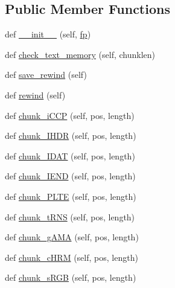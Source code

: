 \subsection*{Public Member Functions}
\begin{DoxyCompactItemize}
\item 
def \hyperlink{classPIL_1_1PngImagePlugin_1_1PngStream_a3918aac793d395b786702debde19877a}{\+\_\+\+\_\+init\+\_\+\+\_\+} (self, \hyperlink{classPIL_1_1PngImagePlugin_1_1ChunkStream_ae424bdb25dadd6b9ed72b6b320237703}{fp})
\item 
def \hyperlink{classPIL_1_1PngImagePlugin_1_1PngStream_a2c834960e5357ebe52041cbc9bd8fc65}{check\+\_\+text\+\_\+memory} (self, chunklen)
\item 
def \hyperlink{classPIL_1_1PngImagePlugin_1_1PngStream_a17f480a129ec5ff427efe97280d00217}{save\+\_\+rewind} (self)
\item 
def \hyperlink{classPIL_1_1PngImagePlugin_1_1PngStream_a9f9d9fc444c441753f15a4764c3e661d}{rewind} (self)
\item 
def \hyperlink{classPIL_1_1PngImagePlugin_1_1PngStream_aa6d746819858800e5352be4d1964c6f1}{chunk\+\_\+i\+C\+CP} (self, pos, length)
\item 
def \hyperlink{classPIL_1_1PngImagePlugin_1_1PngStream_a837d9fafa791906be5f5629fafd031f3}{chunk\+\_\+\+I\+H\+DR} (self, pos, length)
\item 
def \hyperlink{classPIL_1_1PngImagePlugin_1_1PngStream_a0059f9cf42da4e524fd6d2b430ca870a}{chunk\+\_\+\+I\+D\+AT} (self, pos, length)
\item 
def \hyperlink{classPIL_1_1PngImagePlugin_1_1PngStream_af260d3369365965fe2345006c1b93ccb}{chunk\+\_\+\+I\+E\+ND} (self, pos, length)
\item 
def \hyperlink{classPIL_1_1PngImagePlugin_1_1PngStream_a16004817b1fe464e10829e44a9659b64}{chunk\+\_\+\+P\+L\+TE} (self, pos, length)
\item 
def \hyperlink{classPIL_1_1PngImagePlugin_1_1PngStream_a1307fe0bd8efe57a59533158c83d600c}{chunk\+\_\+t\+R\+NS} (self, pos, length)
\item 
def \hyperlink{classPIL_1_1PngImagePlugin_1_1PngStream_a178247bb6b47d9412c6a31e301276c1d}{chunk\+\_\+g\+A\+MA} (self, pos, length)
\item 
def \hyperlink{classPIL_1_1PngImagePlugin_1_1PngStream_a6c101c3b707568a9b5ca32c3e0b624be}{chunk\+\_\+c\+H\+RM} (self, pos, length)
\item 
def \hyperlink{classPIL_1_1PngImagePlugin_1_1PngStream_ad627640129e9744c273d88b101e73fb7}{chunk\+\_\+s\+R\+GB} (self, pos, length)

\end{DoxyCompactItemize}
